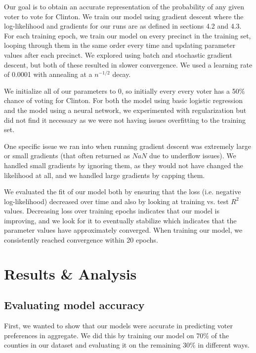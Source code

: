 \documentclass[10pt, letterpaper]{article}
\begin{document}
\begin{multicols}{2}
Our goal is to obtain an accurate representation of the probability of any given voter to vote for Clinton. We train our model using gradient descent where the log-likelihood and gradients for our runs are as defined in sections 4.2 and 4.3. For each training epoch, we train our model on every precinct in the training set, looping through them in the same order every time and updating parameter values after each precinct. We explored using batch and stochastic gradient descent, but both of these resulted in slower convergence. We used a learning rate of 0.0001 with annealing at a $n^{-1/2}$ decay. 

We initialize all of our parameters to 0, so initially every every voter has a 50\% chance of voting for Clinton. For both the model using basic logistic regression and the model using a neural network, we experimented with regularization but did not find it necessary as we were not having issues overfitting to the training set.

One specific issue we ran into when running gradient descent was extremely large or small gradients (that often returned as $NaN$ due to underflow issues). We handled small gradients by ignoring them, as they would not have changed the likelihood at all, and we handled large gradients by capping them.

We evaluated the fit of our model both by ensuring that the loss (i.e. negative log-likelihood) decreased over time and also by looking at training vs. test $R^2$ values. Decreasing loss over training epochs indicates that our model is improving, and we look for it to eventually stabilize which indicates that the parameter values have approximately converged. When training our model, we consistently reached convergence within 20 epochs.

\section{Results \& Analysis}

\subsection{Evaluating model accuracy}
First, we wanted to show that our models were accurate in predicting voter preferences in aggregate. We did this by training our model on 70\% of the counties in our dataset and evaluating it on the remaining 30\% in different ways.


\end{multicols}
\end{document}
